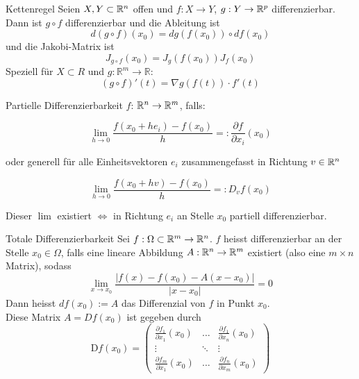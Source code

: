 \begin{Satz}{Kettenregel}{}
	Seien $X,Y \subset \mathbb{R}^n$ offen und $f: X \to Y$, $g: Y \to \mathbb{R}^p$ differenzierbar. Dann ist $g \circ f$ differenzierbar und die Ableitung ist \[d(g\circ f)(x_0) = dg(f(x_0))\circ df(x_0)\] und die Jakobi-Matrix ist \[J_{g\circ f}(x_0) = J_g(f(x_0))J_f(x_0)\]
	Speziell für $X \subset R$ und $g: \mathbb{R}^m \rightarrow \mathbb{R}$:
	\begin{equation*}
	    (g \circ f)'(t) = \nabla g (f(t)) \cdot f'(t)
	\end{equation*}
\end{Satz}
\begin{Definition}{Partielle Differenzierbarkeit}{}
	$f$: $\mathbb{R}^n \rightarrow \mathbb{R}^m$, falls:

	\[
    	\lim_{h \rightarrow 0} \frac{f(x_0 + h e_i)-f(x_0)}{h} =: \frac{\partial f}{\partial x_i}(x_0)
	\]

	oder generell für alle Einheitsvektoren $e_i$ zusammengefasst in Richtung $v \in \mathbb{R}^n$

	\[
    	\lim_{h \rightarrow 0} \frac{f(x_0 + h v)-f(x_0)}{h} =: D_v f(x_0)
	\]

	Dieser $\lim$ existiert $\Leftrightarrow$ in Richtung $e_i$ an Stelle $x_0$ partiell differenzierbar.
\end{Definition}
\begin{Definition}{Totale Differenzierbarkeit}{}
	Sei $f: \Omega \subset \mathbb{R}^m \to \mathbb{R}^n$. $f$ heisst differenzierbar an der Stelle $x_0 \in \Omega$, falls eine lineare Abbildung $A: \mathbb{R}^n \to \mathbb{R}^m$ existiert (also eine $m \times n$ Matrix), sodass \[\lim_{x \to x_0} \frac{|f(x) - f(x_0) - A(x - x_0)|}{|x - x_0|} = 0\] Dann heisst $df(x_0) := A$ das Differenzial von $f$ in Punkt $x_0$. \\
	Diese Matrix $A = Df(x_0)$ ist gegeben durch
	\[
		\text{D}f(x_0) =
        \begin{pmatrix}
            \frac{\partial f_1}{\partial x_1}(x_0)&\hdots&\frac{\partial f_1}{\partial x_n}(x_0)\\
            \vdots&\ddots&\vdots\\
            \frac{\partial f_m}{\partial x_1}(x_0)&\hdots&\frac{\partial f_n}{\partial x_m}(x_0)
        \end{pmatrix}
    \]
\end{Definition}
